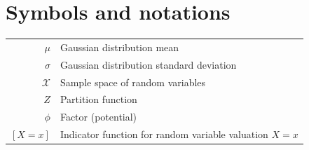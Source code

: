 {\let\cleardoublepage\relax{} \chapter*{Symbols and notations}}
\begin{tabular}{rl}
  $\mu$ & Gaussian distribution mean\\
  $\sigma$ & Gaussian distribution standard deviation\\
  $\mathcal{X}$ & Sample space of random variables\\
  $Z$ & Partition function\\
  $\phi$ & Factor (potential)\\
  $[X=x]$ & Indicator function for random variable valuation $X=x$\\
\end{tabular}

\listoffigures

{\let\cleardoublepage\relax{} \listoftables}

\listofalgorithms

\tableofcontents

